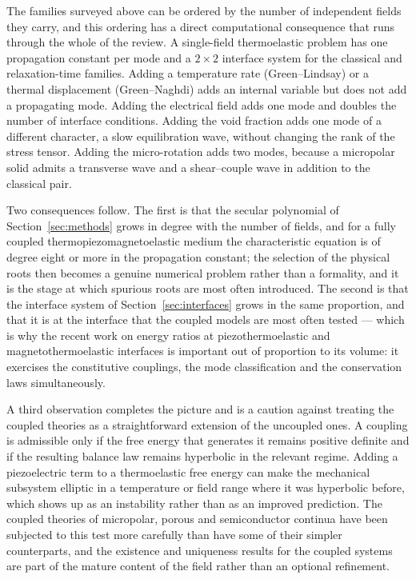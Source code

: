 The families surveyed above can be ordered by the number of independent fields they carry, and this ordering has a direct computational consequence that runs through the whole of the review. A single-field thermoelastic problem has one propagation constant per mode and a $2\times 2$ interface system for the classical and relaxation-time families. Adding a temperature rate (Green--Lindsay) or a thermal displacement (Green--Naghdi) adds an internal variable but does not add a propagating mode. Adding the electrical field adds one mode and doubles the number of interface conditions. Adding the void fraction adds one mode of a different character, a slow equilibration wave, without changing the rank of the stress tensor. Adding the micro-rotation adds two modes, because a micropolar solid admits a transverse wave and a shear--couple wave in addition to the classical pair.

Two consequences follow. The first is that the secular polynomial of Section~\ref{sec:methods} grows in degree with the number of fields, and for a fully coupled thermopiezomagnetoelastic medium the characteristic equation is of degree eight or more in the propagation constant; the selection of the physical roots then becomes a genuine numerical problem rather than a formality, and it is the stage at which spurious roots are most often introduced. The second is that the interface system of Section~\ref{sec:interfaces} grows in the same proportion, and that it is at the interface that the coupled models are most often tested --- which is why the recent work on energy ratios at piezothermoelastic and magnetothermoelastic interfaces \cite{Barak2023,Barak2023IJP,Barak2023JTS,Barak2023MMMS,Gupta2023Energy,Gupta2023IJNMF,Kumar2023PhysScr,Gupta2026HeatMap} is important out of proportion to its volume: it exercises the constitutive couplings, the mode classification and the conservation laws simultaneously.

A third observation completes the picture and is a caution against treating the coupled theories as a straightforward extension of the uncoupled ones. A coupling is admissible only if the free energy that generates it remains positive definite and if the resulting balance law remains hyperbolic in the relevant regime. Adding a piezoelectric term to a thermoelastic free energy can make the mechanical subsystem elliptic in a temperature or field range where it was hyperbolic before, which shows up as an instability rather than as an improved prediction. The coupled theories of micropolar, porous and semiconductor continua have been subjected to this test more carefully than have some of their simpler counterparts, and the existence and uniqueness results for the coupled systems \cite{Iesan2013} are part of the mature content of the field rather than an optional refinement.

